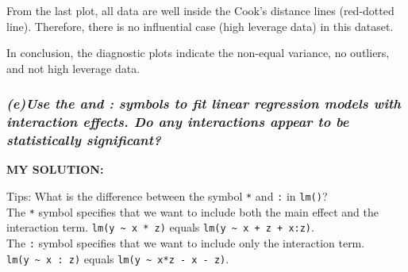 \documentclass[
]{article}
\begin{document}
From the last plot, all data are well inside the Cook's distance lines
(red-dotted line). Therefore, there is no influential case (high
leverage data) in this dataset.

In conclusion, the diagnostic plots indicate the non-equal variance, no
outliers, and not high leverage data.

\hypertarget{euse-the-and-symbols-to-fit-linear-regression-models-with-interaction-effects.-do-any-interactions-appear-to-be-statistically-significant}{%
\subsubsection{\texorpdfstring{\emph{(e)Use the and : symbols to fit
linear regression models with interaction effects. Do any interactions
appear to be statistically
significant?}}{(e)Use the and : symbols to fit linear regression models with interaction effects. Do any interactions appear to be statistically significant?}}\label{euse-the-and-symbols-to-fit-linear-regression-models-with-interaction-effects.-do-any-interactions-appear-to-be-statistically-significant}}

\textbf{MY SOLUTION:}

Tips: What is the difference between the symbol \texttt{*} and
\texttt{:} in \texttt{lm()}?\\
The \texttt{*} symbol specifies that we want to include both the main
effect and the interaction term.
\texttt{lm(y\ \textasciitilde{}\ x\ *\ z)} equals
\texttt{lm(y\ \textasciitilde{}\ x\ +\ z\ +\ x:z)}.\\
The \texttt{:} symbol specifies that we want to include only the
interaction term. \texttt{lm(y\ \textasciitilde{}\ x\ :\ z)} equals
\texttt{lm(y\ \textasciitilde{}\ x*z\ -\ x\ -\ z)}.
\end{document}

